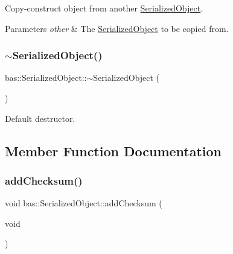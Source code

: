 Copy-\/construct object from another \mbox{\hyperlink{classbas_1_1SerializedObject}{Serialized\+Object}}. 


\begin{DoxyParams}{Parameters}
{\em other} & The \mbox{\hyperlink{classbas_1_1SerializedObject}{Serialized\+Object}} to be copied from. \\
\hline
\end{DoxyParams}
\mbox{\label{classbas_1_1SerializedObject_a0cc782ee2adf54d1811c927ed898be9e}} 
\subsubsection{\texorpdfstring{$\sim$SerializedObject()}{~SerializedObject()}}
{\footnotesize\ttfamily bas\+::\+Serialized\+Object\+::$\sim$\+Serialized\+Object (\begin{DoxyParamCaption}{ }\end{DoxyParamCaption})\hspace{0.3cm}{\ttfamily [default]}}



Default destructor. 



\subsection{Member Function Documentation}
\mbox{\label{classbas_1_1SerializedObject_af8f20a4d1dc60ae0f30c0de483c86ee8}} 
\subsubsection{\texorpdfstring{addChecksum()}{addChecksum()}}
{\footnotesize\ttfamily void bas\+::\+Serialized\+Object\+::add\+Checksum (\begin{DoxyParamCaption}\item[{void}]{ }\end{DoxyParamCaption})\hspace{0.3cm}{\ttfamily [inline]}}



